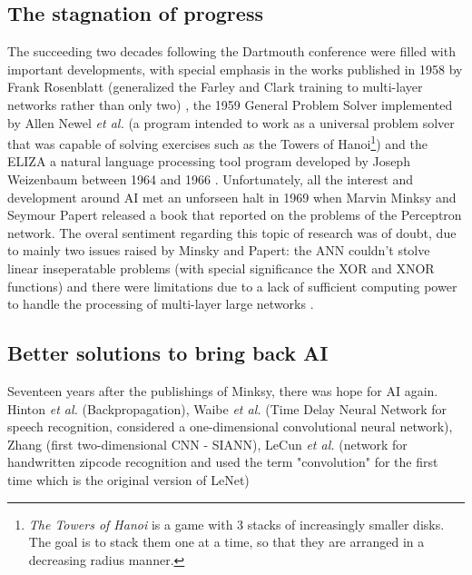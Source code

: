 \documentclass[12pt]{article}
\begin{document}
\subsection{The stagnation of progress}
\par The succeeding two decades following the Dartmouth conference were filled with important developments, with special emphasis in the works published in 1958 by Frank Rosenblatt (generalized the Farley and Clark training to multi-layer networks rather than only two) \autocite{rosenblattPerceptronProbabilisticModel1958}, the 1959 General Problem Solver implemented by Allen Newel \textit{et al.} (a program intended to work as a universal problem solver that was capable of solving exercises such as the Towers of Hanoi\footnote{\textit{The Towers of Hanoi} is a game with 3 stacks of increasingly smaller disks. The goal is to stack them one at a time, so that they are arranged in a decreasing radius manner.}) \autocite{newell1959report} and the ELIZA a natural language processing tool program developed by Joseph Weizenbaum between 1964 and 1966 \autocite{weizenbaumELIZAComputerProgram1966}. Unfortunately, all the interest and development around AI met an unforseen halt in 1969 when Marvin Minksy and Seymour Papert released a book that reported on the problems of the Perceptron network. The overal sentiment regarding this topic of research was of doubt, due to mainly two issues raised by Minsky and Papert: the ANN couldn't stolve linear inseperatable problems (with special significance the XOR and XNOR functions) and there were limitations due to a lack of sufficient computing power to handle the processing of multi-layer large networks \autocite{minsky69perceptrons}.

\subsection{Better solutions to bring back AI}
Seventeen years after the publishings of Minksy, there was hope for AI again. Hinton \textit{et al.} (Backpropagation), Waibe \textit{et al.} (Time Delay Neural Network for speech recognition, considered a one-dimensional convolutional neural network), Zhang (first two-dimensional CNN - SIANN), LeCun \textit{et al.} (network for handwritten zipcode recognition and used the term "convolution" for the first time which is the original version of LeNet)

\end{document}
